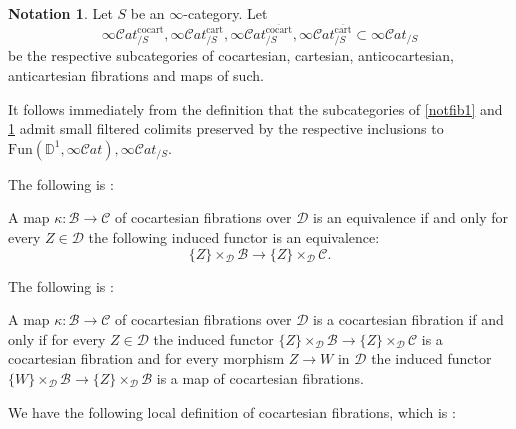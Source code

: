 \documentclass[10pt,oneside]{article}
\numberwithin{equation}{section} %
\numberwithin{figure}{section} %
\theoremstyle{plain}
\theoremstyle{definition}
\newtheorem{notation}[thm]{Notation}
\newcommand{\bD}{{\mathbb D}}
\newcommand{\mB}{{\mathcal B}}
\newcommand{\mC}{{\mathcal C}}
\newcommand{\mD}{{\mathcal D}}
\newcommand{\Fun}{\mathrm{Fun}}
\newcommand{\cocart}{{\mathrm{cocart}}}
\newcommand{\cart}{{\mathrm{cart}}}
\newcommand{\scat}{\mathcal{C}\mathit{at}}
\begin{document}
\begin{notation}\label{notfib2} Let $S$ be an $\infty$-category.
Let $$ \infty\scat^\cocart_{/S}, \infty\scat^\cart_{/S}, \infty\scat^{\overline{\cocart}}_{/S}, \infty\scat^{\overline{\cart}}_{/S} \subset \infty\scat_{/S} $$ be the respective subcategories of cocartesian, cartesian, anticocartesian, anticartesian fibrations and maps of such.

\end{notation}

\begin{remark}\label{seqcol}
It follows immediately from the definition that the subcategories of
\cref{notfib1} and \cref{notfib2} admit small filtered colimits preserved by the respective inclusions to
$\Fun(\bD^1,\infty\scat), \infty\scat_{/S}.$
\end{remark}



The following is \cite[Corollary 3.3.3]{gepner2026fibrations}:

\begin{corollary}\label{fiberwiseeq}

A map $\kappa: \mB \to \mC$ of cocartesian fibrations over $\mD$ is an equivalence if and only for every $Z \in \mD$ the following induced functor is an equivalence:
$$ \{Z\} \times_\mD \mB \to  \{Z\} \times_\mD \mC. $$
    
\end{corollary}



The following is \cite[Corollary 3.3.6]{gepner2026fibrations}:

\begin{corollary}\label{paracocart}
A map $\kappa: \mB \to \mC$ of cocartesian fibrations over $\mD$ is a cocartesian fibration if and only if for every $Z \in \mD$ the induced functor 
$
\{Z\} \times_\mD \mB \to  \{Z\} \times_\mD \mC
$
is a cocartesian fibration and for every morphism $Z \to W$ in $\mD$ the induced functor
$\{W\} \times_\mD \mB \to \{Z\} \times_\mD \mB$
is a map of cocartesian fibrations.
   
\end{corollary}

We have the following local definition of cocartesian fibrations, which is \cite[Corollary 3.3.8]{gepner2026fibrations}:
\end{document}
